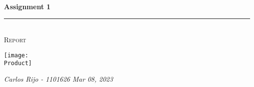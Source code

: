 \documentclass[a4paper,11pt,twoside]{article}
\newcommand{\HRule}{\rule{\linewidth}{0.3mm}}                       %
\newcommand{\Logo}{logo.jpg}
\newcommand{\Product}{cover.jpg}
\newcommand{\Title}{Assignment 1}
\newcommand{\Subtitle}{Report}
\newcommand{\DocumentDate}{Mar 08, 2023}
\begin{document}
\begin{titlepage}
    \textcolor{ceiiablue}{\textbf{\Huge \Title}}\\                  %
    \HRule \\[0.2cm]
    \textsc{\Large \Subtitle}                                       %
    \vfill
    \begin{center}
        \texttt{[image: \\Product]}
    \end{center}

    {\raggedleft\vfill\itshape{
        Carlos Rijo - 1101626
        \newline
        \DocumentDate}
    }
\end{titlepage}

\clearpage

\tableofcontents
\newpage




%

\clearpage
% 
% 
\end{document}
